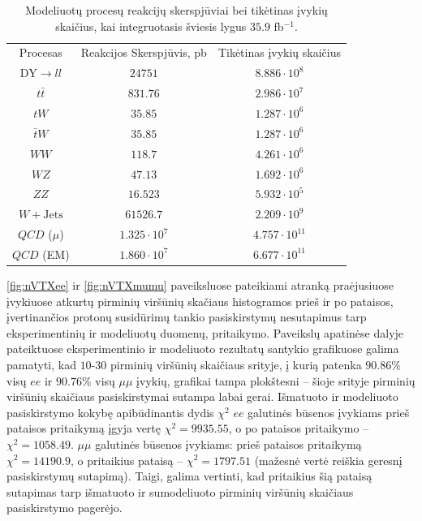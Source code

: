 \documentclass[a4paper, 12pt]{article}
\newcommand{\tbarW}{\bar{t}W}
\newcommand{\ttbar}{t\bar{t}}
\newcommand{\mumu}{\mu\mu}
\newcommand{\WJets}{W\! +\!\mathrm{Jets}}
\newcommand{\invfb}{fb$^{-1}$}
\newcommand{\QCD}{QC\! D}
\begin{document}
\begin{centering}
\begin{table}
\begin{tabular}{|c|c|c|}
	\hline 
	\multirow{3}{6em}{\centering Procesas} & \multirow{3}{7em}{\centering Reakcijos Skerspjūvis, pb} & \multirow{3}{7em}{\centering Tikėtinas įvykių skaičius} \\
	& & \\
	& & \\
	\hline \hline
	$\mathrm{DY}\rightarrow ll$ & $24751$ & $8.886 \cdot 10^8$ \\
	\hline
	$\ttbar$ & $831.76$ & $2.986 \cdot 10^7$ \\
	\hline
	$tW$ & $35.85$ & $1.287 \cdot 10^6$ \\
	\hline
	$\tbarW$ & $35.85$ & $1.287 \cdot 10^6$ \\
	\hline
	$WW$ & $118.7$ & $4.261 \cdot 10^6$ \\
	\hline
	$WZ$ & $47.13$ & $1.692 \cdot 10^6$ \\
	\hline
	$ZZ$ & $16.523$ & $5.932 \cdot 10^5$ \\
	\hline
	$\WJets$ & $61526.7$ & $2.209 \cdot 10^9$ \\
	\hline
	$\QCD$ ($\mu$) & $1.325 \cdot 10^7$ & $4.757 \cdot 10^{11}$ \\
	\hline
	$\QCD$ (EM) & $1.860 \cdot 10^7$ & $6.677 \cdot 10^{11}$ \\
	\hline
\end{tabular}
\caption{\label{table:Xsec} Modeliuotų procesų reakcijų skerspjūviai bei tikėtinas įvykių skaičius, kai integruotasis
	šviesis lygus $35.9$ \invfb.}
\end{table}
\end{centering}

\ref{fig:nVTXee} ir \ref{fig:nVTXmumu} paveiksluose pateikiami atranką praėjusiuose įvykiuose atkurtų pirminių viršūnių
skačiaus histogramos prieš ir po pataisos, įvertinančios protonų susidūrimų tankio pasiskirstymų nesutapimus tarp
eksperimentinių ir modeliuotų duomenų, pritaikymo.
Paveikslų apatinėse dalyje pateiktuose eksperimentinio ir modeliuoto rezultatų santykio grafikuose galima pamatyti, kad
$10$-$30$ pirminių viršūnių skaičiaus srityje, į kurią patenka $90.86\%$ visų $ee$ ir $90.76\%$ visų $\mumu$ įvykių,
grafikai tampa plokštesni -- šioje srityje pirminių viršūnių skaičiaus pasiskirstymai sutampa labai gerai.
Išmatuoto ir modeliuoto pasiskirstymo kokybę apibūdinantis dydis $\chi^2$ $ee$ galutinės būsenos įvykiams prieš pataisos
pritaikymą įgyja vertę $\chi^2 = 9935.55$, o po pataisos pritaikymo -- $\chi^2 = 1058.49$.
$\mumu$ galutinės būsenos įvykiams: prieš pataisos pritaikymą $\chi^2 = 14190.9$, o pritaikius pataisą -- $\chi^2 = 1797.51$
(mažesnė vertė reiškia geresnį pasiskirstymų sutapimą).
Taigi, galima vertinti, kad pritaikius šią pataisą sutapimas tarp išmatuoto ir sumodeliuoto pirminių viršūnių skaičiaus
pasiskirstymo pagerėjo.
\end{document}
